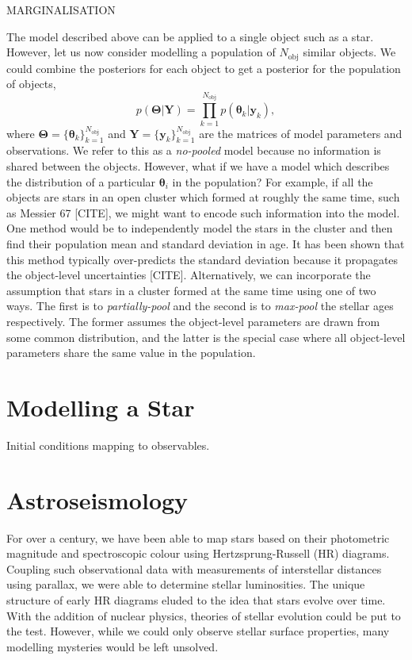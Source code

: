 MARGINALISATION

The model described above can be applied to a single object such as a star. However, let us now consider modelling a population of $N_\mathrm{obj}$ similar objects. We could combine the posteriors for each object to get a posterior for the population of objects,
%
\begin{equation}
    p(\bm{\Theta}|\bm{Y}) = \prod_{k=1}^{N_\mathrm{obj}} p(\bm{\theta}_k|\bm{y}_k),
\end{equation}
%
where $\bm{\Theta} = \{\bm{\theta}_k\}_{k=1}^{N_\mathrm{obj}}$ and $\bm{Y} = \{\bm{y}_k\}_{k=1}^{N_\mathrm{obj}}$ are the matrices of model parameters and observations. We refer to this as a \emph{no-pooled} model because no information is shared between the objects. However, what if we have a model which describes the distribution of a particular $\bm{\theta}_i$ in the population? For example, if all the objects are stars in an open cluster which formed at roughly the same time, such as Messier 67 [CITE], we might want to encode such information into the model. One method would be to independently model the stars in the cluster and then find their population mean and standard deviation in age. It has been shown that this method typically over-predicts the standard deviation because it propagates the object-level uncertainties [CITE]. Alternatively, we can incorporate the assumption that stars in a cluster formed at the same time using one of two ways. The first is to \emph{partially-pool} and the second is to \emph{max-pool} the stellar ages respectively. The former assumes the object-level parameters are drawn from some common distribution, and the latter is the special case where all object-level parameters share the same value in the population.

\section{Modelling a Star}

Initial conditions mapping to observables.

\section{Astroseismology}

For over a century, we have been able to map stars based on their photometric magnitude and spectroscopic colour using Hertzsprung-Russell (HR) diagrams. Coupling such observational data with measurements of interstellar distances using parallax, we were able to determine stellar luminosities. The unique structure of early HR diagrams eluded to the idea that stars evolve over time. With the addition of nuclear physics, theories of stellar evolution could be put to the test. However, while we could only observe stellar surface properties, many modelling mysteries would be left unsolved.

